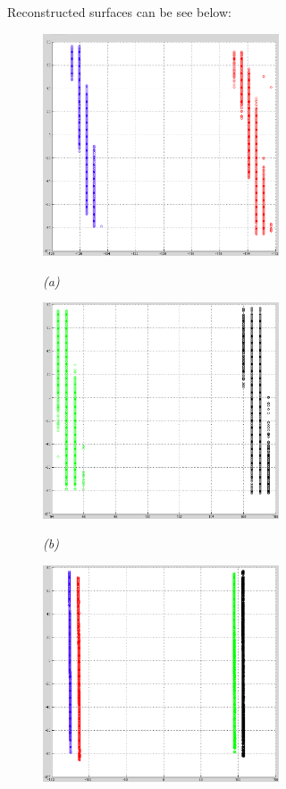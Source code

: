 

Reconstructed surfaces can be see below:

\begin{figure}[htb]
  \begin{minipage}[b]{2.75in}
    \centering
    \centerline{\mbox{\includegraphics[width=2.75in]{data_extraction/images/surface_plane/superior_comparison/Surface1_2.eps}}}
    \centerline{\emph{(a)}}
  \end{minipage}\medskip
  \begin{minipage}[b]{2.75in}
    \centering
    \centerline{\mbox{\includegraphics[width=2.75in]{data_extraction/images/surface_plane/inferior_comparison/Surface3_4.eps}}}
    \centerline{\emph{(b)}}
  \end{minipage}
  \begin{minipage}[b]{2.75in}
    \centering
    \centerline{\mbox{\includegraphics[width=2.75in]{data_extraction/images/surface_plane/Surface1_2_3_4.eps}}}

\end{minipage}
\end{figure}
